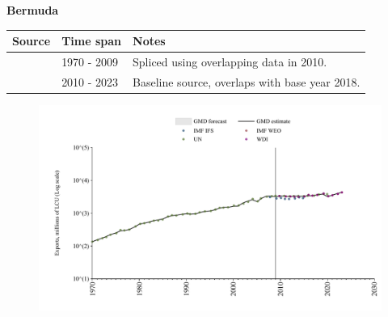 \documentclass[12pt,a4paper,landscape]{article}
\begin{document}
\begin{adjustbox}{max totalsize={\paperwidth}{\paperheight},center}
\begin{minipage}[t][\textheight][t]{\textwidth}
\vspace*{0.5cm}
{}
\begin{center}
{\Large\bfseries Bermuda}
\end{center}
\vspace{0.5cm}
\begin{table}[H]
\centering
\small
\begin{tabular}{|l|l|l|}
\hline
\textbf{Source} & \textbf{Time span} & \textbf{Notes} \\
\hline
\rowcolor{white}\cite{UN}& 1970 - 2009 &Spliced using overlapping data in 2010.\\
\rowcolor{lightgray}\cite{WDI}& 2010 - 2023 &Baseline source, overlaps with base year 2018.\\
\hline
\end{tabular}
\end{table}
\begin{figure}[H]
\centering
\includegraphics[width=\textwidth,height=0.6\textheight,keepaspectratio]{graphs/BMU_exports.pdf}
\end{figure}
\end{minipage}
\end{adjustbox}
\end{document}
